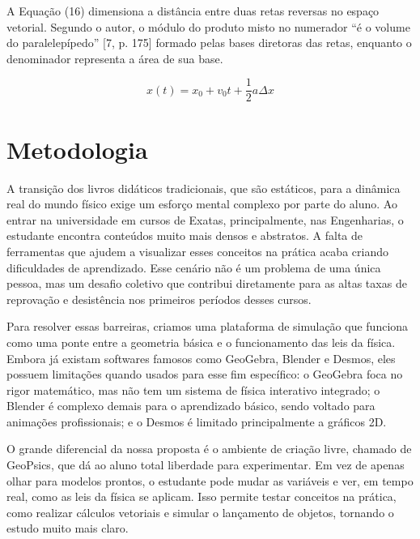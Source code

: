 \documentclass[conference,a4paper]{IEEEtran}
\begin{document}
A Equação (16) dimensiona a distância entre duas retas reversas no espaço vetorial. Segundo o autor, o módulo do produto misto no numerador ``é o volume do paralelepípedo'' [7, p. 175] formado pelas bases diretoras das retas, enquanto o denominador representa a área de sua base.

\begin{equation}
x(t) = x_0 + v_0 t + \frac{1}{2}a\Delta x \tag{17}
\end{equation}

\section{Metodologia}

A transição dos livros didáticos tradicionais, que são estáticos, para a dinâmica real do mundo físico exige um esforço mental complexo por parte do aluno. Ao entrar na universidade em cursos de Exatas, principalmente, nas Engenharias, o estudante encontra conteúdos muito mais densos e abstratos. A falta de ferramentas que ajudem a visualizar esses conceitos na prática acaba criando dificuldades de aprendizado. Esse cenário não é um problema de uma única pessoa, mas um desafio coletivo que contribui diretamente para as altas taxas de reprovação e desistência nos primeiros períodos desses cursos.

Para resolver essas barreiras, criamos uma plataforma de simulação que funciona como uma ponte entre a geometria básica e o funcionamento das leis da física. Embora já existam softwares famosos como GeoGebra, Blender e Desmos, eles possuem limitações quando usados para esse fim específico: o GeoGebra foca no rigor matemático, mas não tem um sistema de física interativo integrado; o Blender é complexo demais para o aprendizado básico, sendo voltado para animações profissionais; e o Desmos é limitado principalmente a gráficos 2D.

O grande diferencial da nossa proposta é o ambiente de criação livre, chamado de GeoPsics, que dá ao aluno total liberdade para experimentar. Em vez de apenas olhar para modelos prontos, o estudante pode mudar as variáveis e ver, em tempo real, como as leis da física se aplicam. Isso permite testar conceitos na prática, como realizar cálculos vetoriais e simular o lançamento de objetos, tornando o estudo muito mais claro.
\end{document}
